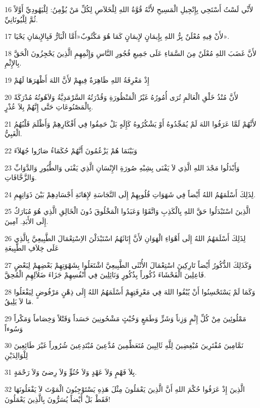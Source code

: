 \par 16 لأَنِّي لَسْتُ أَسْتَحِي بِإِنْجِيلِ الْمَسِيحِ لأَنَّهُ قُوَّةُ اللهِ لِلْخَلاَصِ لِكُلِّ مَنْ يُؤْمِنُ: لِلْيَهُودِيِّ أَوَّلاً ثُمَّ لِلْيُونَانِيِّ.
\par 17 لأَنْ فِيهِ مُعْلَنٌ بِرُّ اللهِ بِإِيمَانٍ لإِيمَانٍ كَمَا هُوَ مَكْتُوبٌ«أَمَّا الْبَارُّ فَبِالإِيمَانِ يَحْيَا».
\par 18 لأَنَّ غَضَبَ اللهِ مُعْلَنٌ مِنَ السَّمَاءِ عَلَى جَمِيعِ فُجُورِ النَّاسِ وَإِثْمِهِمِ الَّذِينَ يَحْجِزُونَ الْحَقَّ بِالإِثْمِ.
\par 19 إِذْ مَعْرِفَةُ اللهِ ظَاهِرَةٌ فِيهِمْ لأَنَّ اللهَ أَظْهَرَهَا لَهُمْ
\par 20 لأَنَّ مُنْذُ خَلْقِ الْعَالَمِ تُرَى أُمُورُهُ غَيْرُ الْمَنْظُورَةِ وَقُدْرَتُهُ السَّرْمَدِيَّةُ وَلاَهُوتُهُ مُدْرَكَةً بِالْمَصْنُوعَاتِ حَتَّى إِنَّهُمْ بِلاَ عُذْرٍ.
\par 21 لأَنَّهُمْ لَمَّا عَرَفُوا اللهَ لَمْ يُمَجِّدُوهُ أَوْ يَشْكُرُوهُ كَإِلَهٍ بَلْ حَمِقُوا فِي أَفْكَارِهِمْ وَأَظْلَمَ قَلْبُهُمُ الْغَبِيُّ.
\par 22 وَبَيْنَمَا هُمْ يَزْعُمُونَ أَنَّهُمْ حُكَمَاءُ صَارُوا جُهَلاَءَ
\par 23 وَأَبْدَلُوا مَجْدَ اللهِ الَّذِي لاَ يَفْنَى بِشِبْهِ صُورَةِ الإِنْسَانِ الَّذِي يَفْنَى وَالطُّيُورِ وَالدَّوَابِّ وَالزَّحَّافَاتِ.
\par 24 لِذَلِكَ أَسْلَمَهُمُ اللهُ أَيْضاً فِي شَهَوَاتِ قُلُوبِهِمْ إِلَى النَّجَاسَةِ لإِهَانَةِ أَجْسَادِهِمْ بَيْنَ ذَوَاتِهِمِ.
\par 25 الَّذِينَ اسْتَبْدَلُوا حَقَّ اللهِ بِالْكَذِبِ وَاتَّقَوْا وَعَبَدُوا الْمَخْلُوقَ دُونَ الْخَالِقِ الَّذِي هُوَ مُبَارَكٌ إِلَى الأَبَدِ. آمِينَ.
\par 26 لِذَلِكَ أَسْلَمَهُمُ اللهُ إِلَى أَهْوَاءِ الْهَوَانِ لأَنَّ إِنَاثَهُمُ اسْتَبْدَلْنَ الاِسْتِعْمَالَ الطَّبِيعِيَّ بِالَّذِي عَلَى خِلاَفِ الطَّبِيعَةِ
\par 27 وَكَذَلِكَ الذُّكُورُ أَيْضاً تَارِكِينَ اسْتِعْمَالَ الأُنْثَى الطَّبِيعِيَّ اشْتَعَلُوا بِشَهْوَتِهِمْ بَعْضِهِمْ لِبَعْضٍ فَاعِلِينَ الْفَحْشَاءَ ذُكُوراً بِذُكُورٍ وَنَائِلِينَ فِي أَنْفُسِهِمْ جَزَاءَ ضَلاَلِهِمِ الْمُحِقَّ.
\par 28 وَكَمَا لَمْ يَسْتَحْسِنُوا أَنْ يُبْقُوا اللهَ فِي مَعْرِفَتِهِمْ أَسْلَمَهُمُ اللهُ إِلَى ذِهْنٍ مَرْفُوضٍ لِيَفْعَلُوا مَا لاَ يَلِيقُ.
\par 29 مَمْلُوئِينَ مِنْ كُلِّ إِثْمٍ وَزِناً وَشَرٍّ وَطَمَعٍ وَخُبْثٍ مَشْحُونِينَ حَسَداً وَقَتْلاً وَخِصَاماً وَمَكْراً وَسُوءاً
\par 30 نَمَّامِينَ مُفْتَرِينَ مُبْغِضِينَ لِلَّهِ ثَالِبِينَ مُتَعَظِّمِينَ مُدَّعِينَ مُبْتَدِعِينَ شُرُوراً غَيْرَ طَائِعِينَ لِلْوَالِدَيْنِ
\par 31 بِلاَ فَهْمٍ وَلاَ عَهْدٍ وَلاَ حُنُوٍّ وَلاَ رِضىً وَلاَ رَحْمَةٍ.
\par 32 الَّذِينَ إِذْ عَرَفُوا حُكْمَ اللهِ أَنَّ الَّذِينَ يَعْمَلُونَ مِثْلَ هَذِهِ يَسْتَوْجِبُونَ الْمَوْتَ لاَ يَفْعَلُونَهَا فَقَطْ بَلْ أَيْضاً يُسَرُّونَ بِالَّذِينَ يَعْمَلُونَ!

